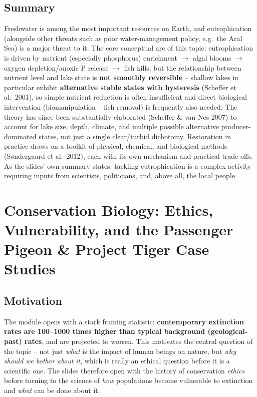 \documentclass[11pt,a4paper]{article}
\begin{document}
\subsection{Summary}
\begin{keybox}
Freshwater is among the most important resources on Earth, and eutrophication (alongside other threats such as poor water-management policy, e.g.\ the Aral Sea) is a major threat to it. The core conceptual arc of this topic: eutrophication is driven by nutrient (especially phosphorus) enrichment $\to$ algal blooms $\to$ oxygen depletion/anoxic P release $\to$ fish kills; but the relationship between nutrient level and lake state is \textbf{not smoothly reversible} -- shallow lakes in particular exhibit \textbf{alternative stable states with hysteresis} (Scheffer et al.\ 2001), so simple nutrient reduction is often insufficient and direct biological intervention (biomanipulation -- fish removal) is frequently also needed. The theory has since been substantially elaborated (Scheffer \& van Nes 2007) to account for lake size, depth, climate, and multiple possible alternative producer-dominated states, not just a single clear/turbid dichotomy. Restoration in practice draws on a toolkit of physical, chemical, and biological methods (S\o{}ndergaard et al.\ 2012), each with its own mechanism and practical trade-offs. As the slides' own summary states: tackling eutrophication is a complex activity requiring inputs from scientists, politicians, and, above all, the local people.
\end{keybox}

\newpage

\section{Conservation Biology: Ethics, Vulnerability, and the Passenger Pigeon \& Project Tiger Case Studies}

\subsection{Motivation}
The module opens with a stark framing statistic: \textbf{contemporary extinction rates are 100--1000 times higher than typical background (geological-past) rates}, and are projected to worsen. This motivates the central question of the topic -- not just \emph{what} is the impact of human beings on nature, but \emph{why should we bother about it}, which is really an ethical question before it is a scientific one. The slides therefore open with the history of conservation \emph{ethics} before turning to the science of \emph{how} populations become vulnerable to extinction and \emph{what} can be done about it.
\end{document}
